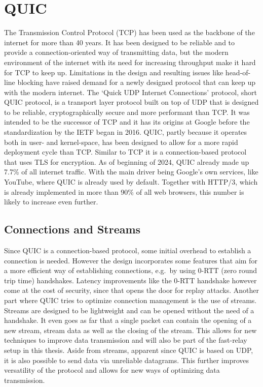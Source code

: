 \section{QUIC}\label{sec:quic_bg}
The Transmission Control Protocol (TCP) has been used as the backbone
of the internet for more than 40 years.
It has been designed to be reliable and to provide a connection-oriented
way of transmitting data, but the modern environment of the internet with
its need for increasing throughput make it hard for TCP to keep up.
Limitations in the design and resulting issues like head-of-line blocking
have raised demand for a newly designed protocol that can keep up with the
modern internet.
The `Quick UDP Internet Connections' protocol, short QUIC protocol, is a 
transport layer protocol built on top of UDP that is designed to be reliable, 
cryptographically secure and more performant than TCP\@.
It was intended to be the successor of TCP and it has its origins at Google before 
the standardization by the IETF began in 2016.
QUIC, partly because it operates both in user- and kernel-space, has been designed to allow for a 
more rapid deployment cycle than TCP\@.
Similar to TCP it is a connection-based protocol that uses TLS for encryption.
As of beginning of 2024, QUIC already made up 7.7\% of all internet traffic.
With the main driver being Google's own services, like YouTube, where QUIC is already used by default.
Together with HTTP/3, which is already implemented in more than 90\% of all web browsers, 
this number is likely to increase even further.

\subsection{Connections and Streams}
Since QUIC is a connection-based protocol, some initial overhead to establish a connection is needed.
However the design incorporates some features that aim for a more efficient way of establishing 
connections, e.g.\ by using 0-RTT (zero round trip time) handshakes.
Latency improvements like the 0-RTT handshake however come at the cost of security, since that opens 
the door for replay attacks.
Another part where QUIC tries to optimize connection management is the use of streams.
Streams are designed to be lightweight and can be opened without the need of a handshake.
It even goes as far that a single packet can contain the opening of a new stream, stream data
as well as the closing of the stream.
This allows for new techniques to improve data transmission and will also be part of the fast-relay 
setup in this thesis.
Aside from streams, apparent since QUIC is based on UDP, it is also possible to send data via
unreliable datagrams.
This further improves versatility of the protocol and allows for new ways of optimizing data transmission.


